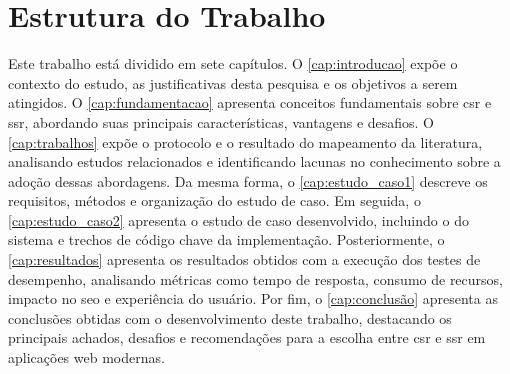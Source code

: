 \section{Estrutura do Trabalho}
Este trabalho está dividido em sete capítulos. O \autoref{cap:introducao} expõe o contexto do estudo, as justificativas desta pesquisa e os objetivos a serem atingidos. O \autoref{cap:fundamentacao} apresenta conceitos fundamentais sobre \acrshort{csr} e \acrshort{ssr}, abordando suas principais características, vantagens e desafios. O \autoref{cap:trabalhos} expõe o protocolo e o resultado do mapeamento da literatura, analisando estudos relacionados e identificando lacunas no conhecimento sobre a adoção dessas abordagens. Da mesma forma, o \autoref{cap:estudo_caso1} descreve os requisitos, métodos e organização do estudo de caso. Em seguida, o \autoref{cap:estudo_caso2} apresenta o estudo de caso desenvolvido, incluindo o  do sistema e trechos de código chave da implementação. Posteriormente, o \autoref{cap:resultados} apresenta os resultados obtidos com a execução dos testes de desempenho, analisando métricas como tempo de resposta, consumo de recursos, impacto no \acrshort{seo} e experiência do usuário. Por fim, o \autoref{cap:conclusão} apresenta as conclusões obtidas com o desenvolvimento deste trabalho, destacando os principais achados, desafios e recomendações para a escolha entre \acrshort{csr} e \acrshort{ssr} em aplicações web modernas.